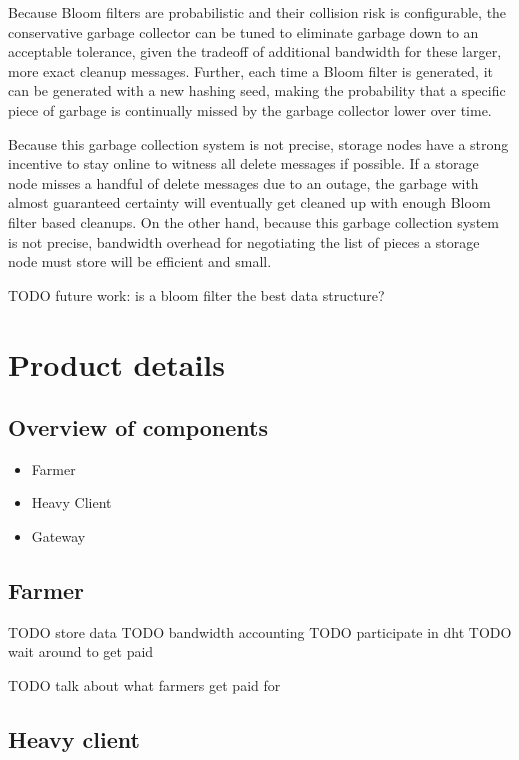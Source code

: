 \documentclass[a4paper,10pt]{article} \usepackage[utf8]{inputenc}
\newcommand{\todo}[1]{{\color{red} TODO #1 }}
\begin{document}
Because Bloom filters are probabilistic and their collision risk is
configurable, the conservative garbage collector can be tuned to eliminate
garbage down to an acceptable tolerance, given the tradeoff of additional
bandwidth for these larger, more exact cleanup messages. Further, each time a
Bloom filter is generated, it can be generated with a new hashing seed, making
the probability that a specific piece of garbage is continually missed by the
garbage collector lower over time.

Because this garbage collection system is not precise, storage nodes have a
strong incentive to stay online to witness all delete messages if possible.
If a storage node misses a handful of delete messages due to an outage, the
garbage with almost guaranteed certainty will eventually get cleaned up with
enough Bloom filter based cleanups.
On the other hand, because this garbage collection system is not precise,
bandwidth overhead for negotiating the list of pieces a storage node must store
will be efficient and small.

\todo{future work: is a bloom filter the best data structure?}

\section{Product details}\label{sec:product_details}

\subsection{Overview of components}

\begin{itemize}
\item Farmer
\item Heavy Client
\item Gateway
\end{itemize}

\subsection{Farmer}

\todo{store data}
\todo{bandwidth accounting}
\todo{participate in dht}
\todo{wait around to get paid}

\todo{talk about what farmers get paid for}

\subsection{Heavy client}
\end{document}
